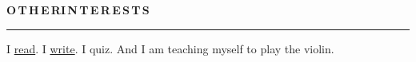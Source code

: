 \documentclass[11pt, a4paper]{article}
\begin{document}
\vspace{8pt}
\textbf{O\,T\,H\,E\,R{\hspace{0.6em}}I\,N\,T\,E\,R\,E\,S\,T\,S}
\vspace{5pt}
\hrule
\vspace{7pt}
I \href{https://www.goodreads.com/user/show/25100820-ankan-bansal}{read}. I
\href{https://computervizion.blogspot.com/}{write}. I quiz. And I am teaching myself to play the
violin.

\end{document}
